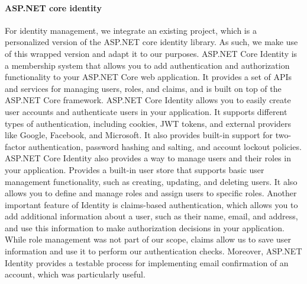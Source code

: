 \paragraph{ASP.NET core identity}
\label{sec:aspnetidentiy}
For identity management, we integrate an existing project, which is a personalized version of the ASP.NET core identity library. As such, we make use of this wrapped version and adapt it to our purposes. ASP.NET Core Identity is a membership system that allows you to add authentication and authorization functionality to your ASP.NET Core web application. It provides a set of APIs and services for managing users, roles, and claims, and is built on top of the ASP.NET Core framework. ASP.NET Core Identity allows you to easily create user accounts and authenticate users in your application. It supports different types of authentication, including cookies, JWT tokens, and external providers like Google, Facebook, and Microsoft. It also provides built-in support for two-factor authentication, password hashing and salting, and account lockout policies. ASP.NET Core Identity also provides a way to manage users and their roles in your application. Provides a built-in user store that supports basic user management functionality, such as creating, updating, and deleting users. It also allows you to define and manage roles and assign users to specific roles.
Another important feature of Identity is claims-based authentication, which allows you to add additional information about a user, such as their name, email, and address, and use this information to make authorization decisions in your application.
\\ While role management was not part of our scope, claims allow us to save user information and use it to perform our authentication checks. Moreover, ASP.NET Identity provides a testable process for implementing email confirmation of an account, which was particularly useful.

